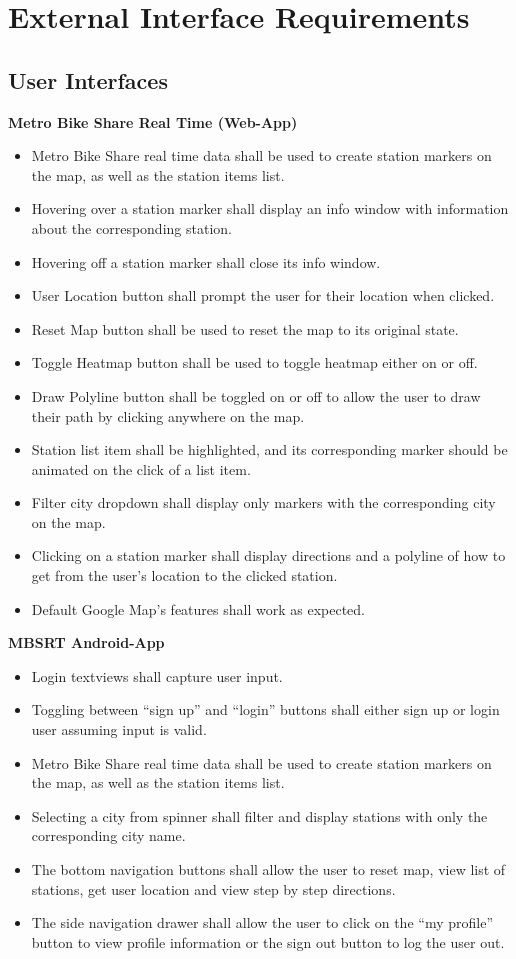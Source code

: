 \documentclass[15pt]{article}
\begin{document}
\newpage

\section{External Interface Requirements}

\subsection{User Interfaces}
\textbf{Metro Bike Share Real Time (Web-App)}
\begin{itemize}
    \item Metro Bike Share real time data shall be used to create station markers on the map, as well as the station items list.
    \item Hovering over a station marker shall display an info window with information about the corresponding station.
    \item Hovering off a station marker shall close its info window.
    \item User Location button shall prompt the user for their location when clicked.
    \item Reset Map button shall be used to reset the map to its original state.
    \item Toggle Heatmap button shall be used to toggle heatmap either on or off.
    \item Draw Polyline button shall be toggled on or off to allow the user to draw their path by clicking anywhere on the map.
    \item Station list item shall be highlighted, and its corresponding marker should be animated on the click of a list item.
    \item Filter city dropdown shall display only markers with the corresponding city on the map.
    \item Clicking on a station marker shall display directions and a polyline of how to get from the user’s location to the clicked station.
    \item Default Google Map’s features shall work as expected.
\end{itemize}

\textbf{MBSRT Android-App}
\begin{itemize}
    \item Login textviews shall capture user input.
    \item Toggling between “sign up” and “login” buttons shall either sign up or login user assuming input is valid.
    \item Metro Bike Share real time data shall be used to create station markers on the map, as well as the station items list.
    \item Selecting a city from spinner shall filter and display stations with only the corresponding city name.
    \item The bottom navigation buttons shall allow the user to reset map, view list of stations, get user location and view step by step directions.
    \item The side navigation drawer shall allow the user to click on the “my profile” button to view profile information or the sign out button to log the user out.
\end{itemize}
\end{document}
